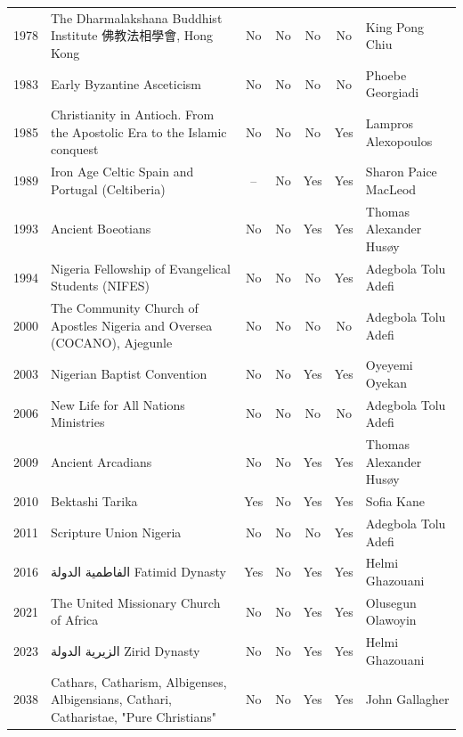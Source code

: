 {\begin{longtable}{rp{3.5cm}ccccp{3cm}}
1978 & {\raggedright The Dharmalakshana Buddhist Institute 佛教法相學會, Hong Kong} & No & No & No & No & {\raggedright King Pong Chiu} \\
1983 & {\raggedright Early Byzantine Asceticism} & No & No & No & No & {\raggedright Phoebe Georgiadi} \\
1985 & {\raggedright Christianity in Antioch. From the Apostolic Era to the Islamic conquest} & No & No & No & Yes & {\raggedright Lampros Alexopoulos} \\
1989 & {\raggedright Iron Age Celtic Spain and Portugal (Celtiberia)} & -- & No & Yes & Yes & {\raggedright Sharon Paice MacLeod} \\
1993 & {\raggedright Ancient Boeotians} & No & No & Yes & Yes & {\raggedright Thomas Alexander Husøy} \\
1994 & {\raggedright Nigeria Fellowship of Evangelical Students (NIFES)} & No & No & No & Yes & {\raggedright Adegbola Tolu Adefi} \\
2000 & {\raggedright The Community Church of Apostles Nigeria and Oversea (COCANO), Ajegunle} & No & No & No & No & {\raggedright Adegbola Tolu Adefi} \\
2003 & {\raggedright Nigerian Baptist Convention} & No & No & Yes & Yes & {\raggedright Oyeyemi Oyekan} \\
2006 & {\raggedright New Life for All Nations Ministries} & No & No & No & No & {\raggedright Adegbola Tolu Adefi} \\
2009 & {\raggedright Ancient Arcadians} & No & No & Yes & Yes & {\raggedright Thomas Alexander Husøy} \\
2010 & {\raggedright Bektashi Tarika} & Yes & No & Yes & Yes & {\raggedright Sofia Kane} \\
2011 & {\raggedright Scripture Union Nigeria} & No & No & No & Yes & {\raggedright Adegbola Tolu Adefi} \\
2016 & {\raggedright {\arabicfont الفاطمية الدولة} Fatimid Dynasty} & Yes & No & Yes & Yes & {\raggedright Helmi Ghazouani} \\
2021 & {\raggedright The United Missionary Church of Africa} & No & No & Yes & Yes & {\raggedright Olusegun Olawoyin} \\
2023 & {\raggedright {\arabicfont الزيرية الدولة} Zirid Dynasty} & No & No & Yes & Yes & {\raggedright Helmi Ghazouani} \\
2038 & {\raggedright Cathars, Catharism, Albigenses, Albigensians, Cathari, Catharistae, "Pure Christians"} & No & No & Yes & Yes & {\raggedright John Gallagher} \\

\end{longtable}}
